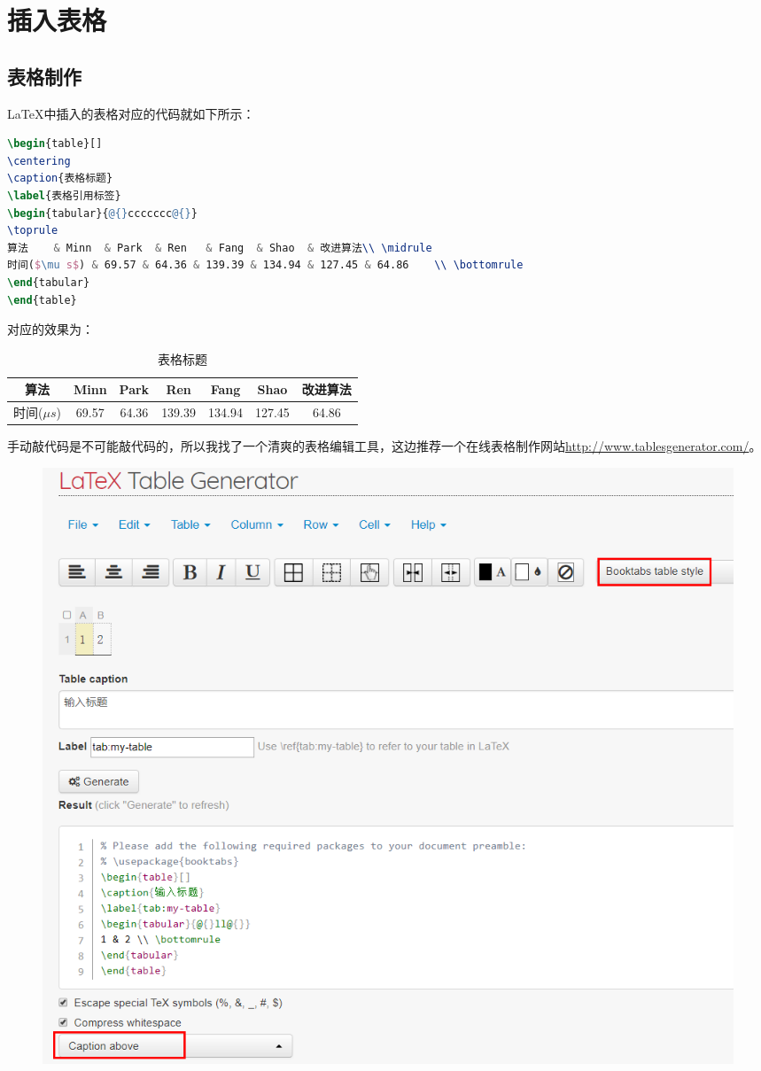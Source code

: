\section{插入表格}
\subsection{表格制作}
LaTeX中插入的表格对应的代码就如下所示：
\begin{lstlisting}[language={tex}, caption={}]
\begin{table}[]
\centering
\caption{表格标题}
\label{表格引用标签}
\begin{tabular}{@{}ccccccc@{}}
\toprule
算法    & Minn  & Park  & Ren   & Fang  & Shao  & 改进算法\\ \midrule
时间($\mu s$) & 69.57 & 64.36 & 139.39 & 134.94 & 127.45 & 64.86    \\ \bottomrule
\end{tabular}
\end{table}
\end{lstlisting}
对应的效果为：
\begin{table}[h]
\centering
\caption{表格标题}
\label{表格引用标签}
\begin{tabular}{@{}ccccccc@{}}
\toprule
算法    & Minn  & Park  & Ren   & Fang  & Shao  & 改进算法\\ \midrule
时间($\mu s$) & 69.57 & 64.36 & 139.39 & 134.94 & 127.45 & 64.86    \\ \bottomrule
\end{tabular}
\end{table}

手动敲代码是不可能敲代码的，所以我找了一个清爽的表格编辑工具，这边推荐一个在线表格制作网站\url{http://www.tablesgenerator.com/}。
\begin{figure}[h]
 \centering
 \includegraphics[width=1\textwidth]{chapters/figures/tableGenerator1.png}
 \caption{}
 \label{}
\end{figure}

